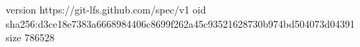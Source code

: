 version https://git-lfs.github.com/spec/v1
oid sha256:d3ce18e7383a6668984406c8699f262a45c93521628730b974bd504073d04391
size 786528

